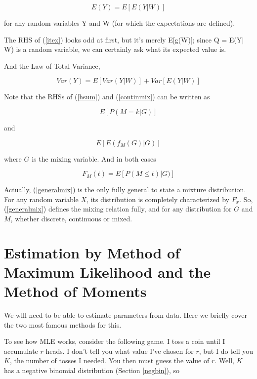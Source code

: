 \begin{equation}
\label{itex}
E(Y)=E[E(Y|W)]
\end{equation}

for any random variables Y and W (for which the expectations are
defined).  

The RHS of (\ref{itex}) looks odd at first, but it's merely E[g(W)];
since Q =  E(Y$|$W) is a random variable, we can certainly ask what its
expected value is.

And the Law of Total Variance,

\begin{equation}
\label{bis}
Var(Y)=E[Var(Y|W)]+Var[E(Y|W)]
\end{equation}

Note that the RHSs of (\ref{hsum}) and (\ref{continmix}) can be written as

\begin{equation}
E[ P(M = k | G) ]
\end{equation}

and

\begin{equation}
E[ E(f_M (G) | G)]
\end{equation}

where $G$ is the mixing variable.  And in both cases

\begin{equation}
\label{generalmix}
F_M(t) = E[ P(M \leq t ) | G) ]
\end{equation}

Actually, (\ref{generalmix}) is the only fully general to state a
mixture distribution.  For any random variable $X$, its distribution is
completely characterized by $F_x$.  So, (\ref{generalmix}) defines the
mixing relation fully, and for any distribution for $G$ and $M$, whether
discrete, continuous or mixed.


\section{Estimation by Method of Maximum Likelihood and the Method of
Moments}

We wlll need to be able to estimate parameters from data.  Here we
briefly cover the two most famous methods for this.

To see how MLE works, consider the following game.  I toss a coin until
I accumulate $r$ heads.  I don't tell you what value I've chosen for
$r$, but I do tell you $K$, the number of tosses I needed.  You then
must guess the value of $r$.  Well, $K$ has a negative binomial
distribution (Section \ref{negbin}), so

